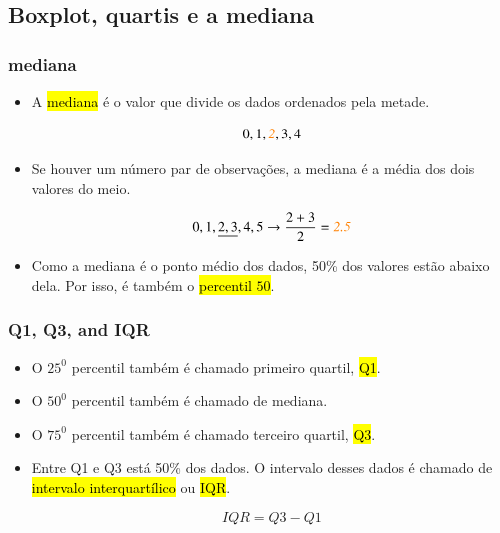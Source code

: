 
\subsection{Boxplot, quartis e a mediana}


\begin{frame}
\frametitle{mediana}

\begin{itemize}
\justifying
\item A \hl{mediana} é o valor que divide  os dados ordenados pela metade.

\[ 0,1,\textit{\textcolor{orange}{2}},3,4 \]
\justifying
\item Se houver um número par de observações, a mediana é a média dos dois valores do meio.

\[ 0,1,\underline{2,3},4,5 \rightarrow \frac{2 + 3}{2} = \textit{\textcolor{orange}{2.5}} \]
\justifying
\item Como a mediana é o ponto médio dos dados, 50\% dos valores estão abaixo dela. Por isso, é também o \hl{percentil $50$}.

\end{itemize}

\end{frame}


\begin{frame}[fragile]
\frametitle{Q1, Q3, and IQR}

\begin{itemize}
\justifying
\item O $25^{0}$ percentil também é chamado  primeiro quartil, \hl{Q1}.
\justifying
\item O $50^{0}$ percentil também é chamado de mediana.
\justifying
\item O $75^{0}$ percentil também é chamado terceiro quartil, \hl{Q3}.
\justifying
\item Entre Q1 e Q3 está 50\% dos dados. O intervalo desses dados é chamado de \hl{intervalo interquartílico} ou \hl{IQR}.

$$
IQR = Q3 - Q1 
$$

\end{itemize}

\end{frame}


